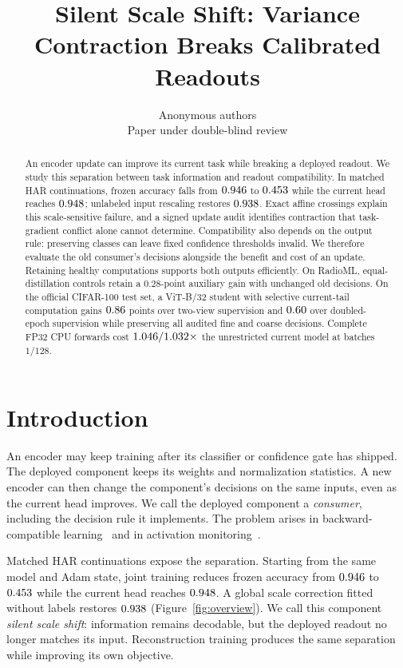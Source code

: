 \documentclass{article}
\title{Silent Scale Shift: Variance Contraction Breaks Calibrated Readouts}
\author{Anonymous authors\\Paper under double-blind review}
\begin{document}
\maketitle

\begin{abstract}
An encoder update can improve its current task while breaking a deployed
readout. We study this separation between task information and readout
compatibility. In matched HAR continuations, frozen accuracy falls from
$0.946$ to $0.453$ while the current head reaches
$0.948$; unlabeled input rescaling restores $0.938$.
Exact affine crossings explain this scale-sensitive failure, and a signed
update audit identifies contraction that task-gradient conflict alone
cannot determine. Compatibility also depends on the output rule: preserving
classes can leave fixed confidence thresholds invalid. We therefore evaluate
the old consumer's decisions alongside the benefit and cost of an update.
Retaining healthy computations supports both outputs efficiently. On RadioML,
equal-distillation controls retain a $0.28$-point auxiliary gain with unchanged
old decisions. On the official CIFAR-100 test set, a ViT-B/32 student with
selective current-tail computation gains $0.86$ points over two-view
supervision and $0.60$ over doubled-epoch supervision while
preserving all audited fine and coarse decisions. Complete FP32 CPU forwards
cost $1.046/1.032\times$ the unrestricted current model at
batches $1/128$.
\end{abstract}

\section{Introduction}\label{sec:intro}

An encoder may keep training after its classifier or confidence gate has
shipped. The deployed component keeps its weights and normalization
statistics. A new encoder can then change the component's decisions on the
same inputs, even as the current head improves. We call the deployed
component a \emph{consumer}, including the decision rule it implements.
The problem arises in backward-compatible learning~\citep{shen2020backward}
and in activation monitoring~\citep{duan2026staleness}.

Matched HAR continuations expose the separation. Starting from the same
model and Adam state, joint training reduces frozen accuracy from
$0.946$ to $0.453$ while the current head reaches
$0.948$. A global scale correction fitted without labels restores
$0.938$ (Figure~\ref{fig:overview}). We call this component
\emph{silent scale shift}: information remains decodable, but the deployed
readout no longer matches its input. Reconstruction training produces the
same separation while improving its own objective.
\end{document}
